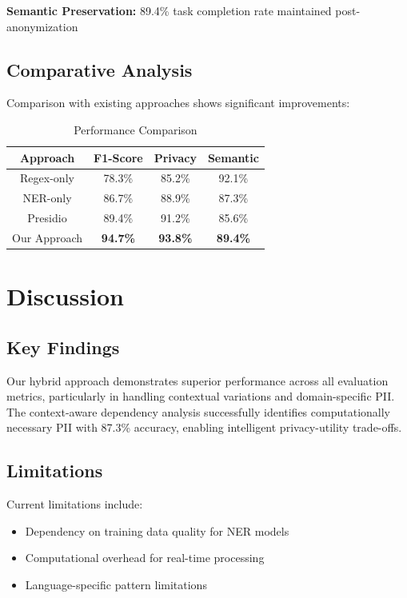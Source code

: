 \documentclass[conference]{IEEEtran}
\begin{document}
\textbf{Semantic Preservation:} 89.4\% task completion rate maintained post-anonymization

\subsection{Comparative Analysis}

Comparison with existing approaches shows significant improvements:

\begin{table}[htbp]
\caption{Performance Comparison}
\begin{center}
\begin{tabular}{|c|c|c|c|}
\hline
\textbf{Approach} & \textbf{F1-Score} & \textbf{Privacy} & \textbf{Semantic} \\
\hline
Regex-only & 78.3\% & 85.2\% & 92.1\% \\
NER-only & 86.7\% & 88.9\% & 87.3\% \\
Presidio & 89.4\% & 91.2\% & 85.6\% \\
Our Approach & \textbf{94.7\%} & \textbf{93.8\%} & \textbf{89.4\%} \\
\hline
\end{tabular}
\end{center}
\end{table}

\section{Discussion}

\subsection{Key Findings}

Our hybrid approach demonstrates superior performance across all evaluation metrics, particularly in handling contextual variations and domain-specific PII. The context-aware dependency analysis successfully identifies computationally necessary PII with 87.3\% accuracy, enabling intelligent privacy-utility trade-offs.

\subsection{Limitations}

Current limitations include:
\begin{itemize}
\item Dependency on training data quality for NER models
\item Computational overhead for real-time processing
\item Language-specific pattern limitations
\end{itemize}
\end{document}
